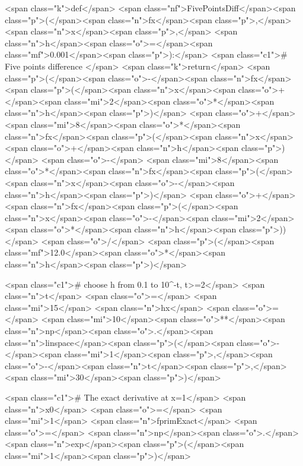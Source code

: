 <span class="k">def</span> <span class="nf">FivePointsDiff</span><span class="p">(</span><span class="n">fx</span><span class="p">,</span> <span class="n">x</span><span class="p">,</span> <span class="n">h</span><span class="o">=</span><span class="mf">0.001</span><span class="p">):</span>
    <span class="c1"># Five points difference </span>
    <span class="k">return</span> <span class="p">(</span><span class="o">-</span><span class="n">fx</span><span class="p">(</span><span class="n">x</span><span class="o">+</span><span class="mi">2</span><span class="o">*</span><span class="n">h</span><span class="p">)</span> <span class="o">+</span> <span class="mi">8</span><span class="o">*</span><span class="n">fx</span><span class="p">(</span><span class="n">x</span><span class="o">+</span><span class="n">h</span><span class="p">)</span> <span class="o">-</span> <span class="mi">8</span><span class="o">*</span><span class="n">fx</span><span class="p">(</span><span class="n">x</span><span class="o">-</span><span class="n">h</span><span class="p">)</span> <span class="o">+</span> <span class="n">fx</span><span class="p">(</span><span class="n">x</span><span class="o">-</span><span class="mi">2</span><span class="o">*</span><span class="n">h</span><span class="p">))</span> <span class="o">/</span> <span class="p">(</span><span class="mf">12.0</span><span class="o">*</span><span class="n">h</span><span class="p">)</span>

<span class="c1"># choose h from 0.1 to 10^-t, t>=2</span>
<span class="n">t</span> <span class="o">=</span> <span class="mi">15</span>
<span class="n">hx</span> <span class="o">=</span> <span class="mi">10</span><span class="o">**</span><span class="n">np</span><span class="o">.</span><span class="n">linspace</span><span class="p">(</span><span class="o">-</span><span class="mi">1</span><span class="p">,</span><span class="o">-</span><span class="n">t</span><span class="p">,</span> <span class="mi">30</span><span class="p">)</span>

<span class="c1"># The exact derivative at x=1</span>
<span class="n">x0</span> <span class="o">=</span> <span class="mi">1</span>
<span class="n">fprimExact</span> <span class="o">=</span> <span class="n">np</span><span class="o">.</span><span class="n">exp</span><span class="p">(</span><span class="mi">1</span><span class="p">)</span>

